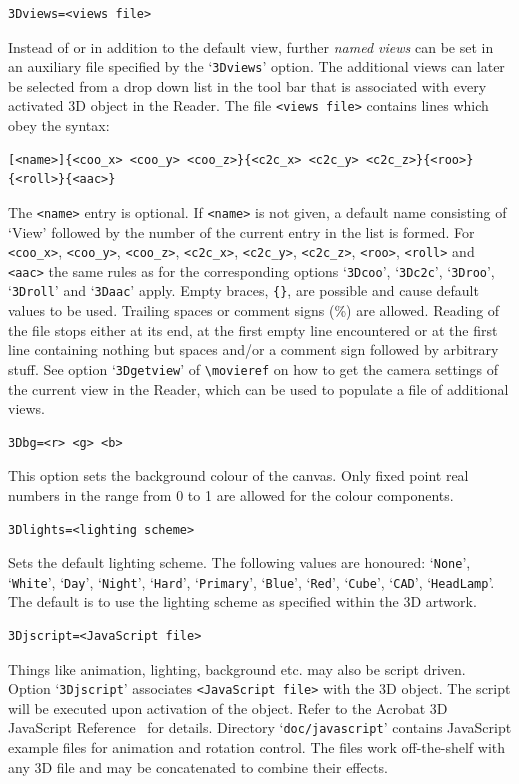 \documentclass[a4paper]{article}
\begin{document}
\begin{verbatim}
3Dviews=<views file>
\end{verbatim}
Instead of or in addition to the default view, further \emph{named views} can be set in an auxiliary file specified by the `\verb+3Dviews+' option. The additional views can later be selected from a drop down list in the tool bar that is associated with every activated 3D object in the Reader. The file \verb+<views file>+ contains lines which obey the syntax:
\begin{verbatim}
[<name>]{<coo_x> <coo_y> <coo_z>}{<c2c_x> <c2c_y> <c2c_z>}{<roo>}{<roll>}{<aac>}
\end{verbatim}
The \verb+<name>+ entry is optional. If \verb+<name>+ is not given, a default name consisting of `View' followed by the number of the current entry in the list is formed. For \verb+<coo_x>+, \verb+<coo_y>+, \verb+<coo_z>+, \verb+<c2c_x>+, \verb+<c2c_y>+, \verb+<c2c_z>+, \verb+<roo>+, \verb+<roll>+ and \verb+<aac>+ the same rules as for the corresponding options `\verb+3Dcoo+', `\verb+3Dc2c+', `\verb+3Droo+', `\verb+3Droll+' and `\verb+3Daac+' apply. Empty braces, \verb+{}+, are possible and cause default values to be used. Trailing spaces or comment signs (\%) are allowed. Reading of the file stops either at its end, at the first empty line encountered or at the first line containing nothing but spaces and/or a comment sign followed by arbitrary stuff. See option `\verb+3Dgetview+' of \verb+\movieref+ on how to get the camera settings of the current view in the Reader, which can be used to populate a file of additional views.
\begin{verbatim}
3Dbg=<r> <g> <b>
\end{verbatim}
This option sets the background colour of the canvas. Only fixed point real numbers in the range from 0 to 1 are allowed for the colour components.
\begin{verbatim}
3Dlights=<lighting scheme>
\end{verbatim}
Sets the default lighting scheme. The following values are honoured: `\verb+None+', `\verb+White+', `\verb+Day+', `\verb+Night+', `\verb+Hard+', `\verb+Primary+', `\verb+Blue+', `\verb+Red+', `\verb+Cube+', `\verb+CAD+', `\verb+HeadLamp+'. The default is to use the lighting scheme as specified within the 3D artwork.
\begin{verbatim}
3Djscript=<JavaScript file>
\end{verbatim}
Things like animation, lighting, background etc. may also be script driven. Option `\verb+3Djscript+' associates \verb+<JavaScript file>+ with the 3D object. The script will be executed upon activation of the object. Refer to the Acrobat 3D JavaScript Reference~\cite{jscript3D} for details. Directory `\verb+doc/javascript+' contains JavaScript example files for animation and rotation control. The files work off-the-shelf with any 3D file and may be concatenated to combine their effects.
\end{document}
